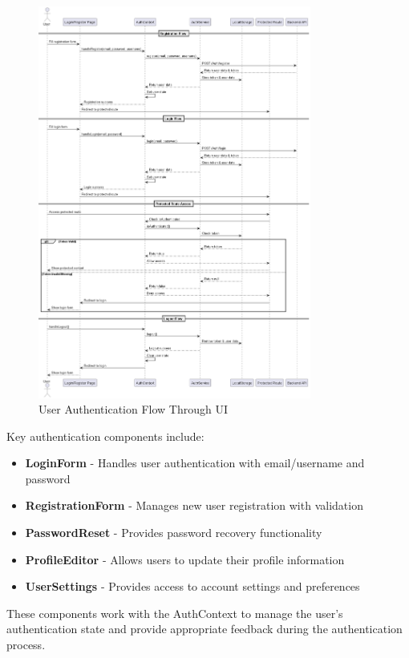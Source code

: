 \begin{figure}[h]
    \centering
    \includegraphics[width=0.8\textwidth]{./Chapter07/figures/authentication_ui_flow.png}
    \caption{User Authentication Flow Through UI}
    \label{fig:authentication-ui-flow}
\end{figure}

Key authentication components include:

\begin{itemize}
  \item \textbf{LoginForm} - Handles user authentication with email/username and password
  \item \textbf{RegistrationForm} - Manages new user registration with validation
  \item \textbf{PasswordReset} - Provides password recovery functionality
  \item \textbf{ProfileEditor} - Allows users to update their profile information
  \item \textbf{UserSettings} - Provides access to account settings and preferences
\end{itemize}

These components work with the AuthContext to manage the user's authentication state and provide appropriate feedback during the authentication process.

